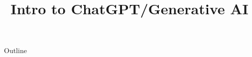 \documentclass[xcolor=dvipsnames,compress,t,pdf,9pt]{beamer}
\title[\insertframenumber /\inserttotalframenumber]{Intro to ChatGPT/Generative AI} %
\begin{document}
	\begin{frame}
	\titlepage
	\end{frame}
	
	\begin{frame}{Outline}
	    \tableofcontents
	\end{frame}

	
	
	
	
\end{document}
